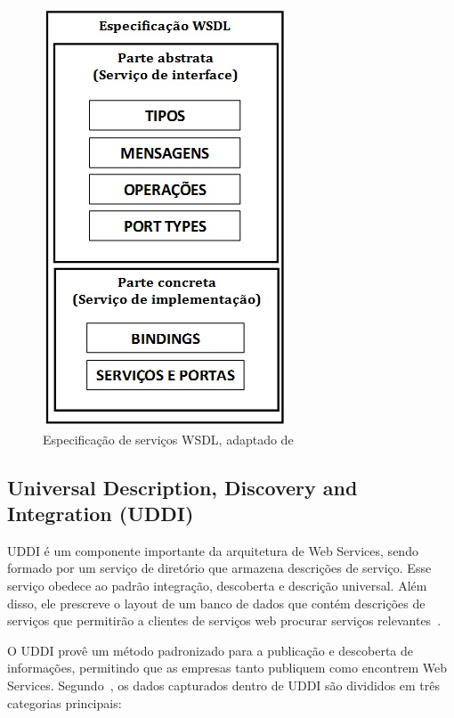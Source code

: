 \begin{figure}[!htb]
\centering
\includegraphics[scale=0.5]{COMPOSICAO_WSDL.jpg}
\caption{Especificação de serviços WSDL, adaptado de~\cite{Bertino2010}}
\label{fig:composicao_WSDL}
\end{figure}


\subsection{Universal Description, Discovery and Integration (UDDI)}

UDDI é um componente importante da arquitetura de Web Services, sendo formado por um serviço de diretório que armazena descrições de serviço. Esse serviço obedece ao padrão integração, descoberta e descrição universal. Além disso,  ele prescreve o layout de um banco de dados que contém  descrições de serviços que permitirão a clientes de serviços web procurar serviços relevantes~\cite{TANENBAUM2007}.

O UDDI provê um método padronizado para a publicação e descoberta de informações, permitindo que as empresas tanto publiquem como encontrem Web Services. Segundo~\cite{Cerami2002}, os dados capturados dentro de UDDI são divididos em três categorias principais:


